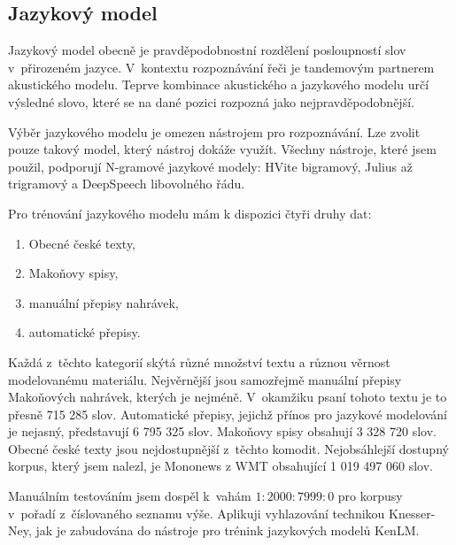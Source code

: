 \subsection{Jazykový model}
\label{sec:jazykovy-model}

Jazykový model obecně je pravděpodobnostní rozdělení posloupností slov
v~přirozeném jazyce\cite{ponte1998language}. V~kontextu rozpoznávání řeči je tandemovým
partnerem akustického modelu\cite{jelinek1990self}. Teprve kombinace akustického
a jazykového modelu určí výsledné slovo, které se na dané pozici rozpozná jako
nejpravděpodobnější.

Výběr jazykového modelu je omezen nástrojem pro rozpoznávání. Lze zvolit pouze
takový model, který nástroj dokáže využít. Všechny nástroje, které jsem použil,
podporují N-gramové jazykové modely: HVite bigramový, Julius až trigramový a
DeepSpeech libovolného řádu.

Pro trénování jazykového modelu mám k dispozici čtyři druhy dat:
\begin{enumerate}
\item{Obecné české texty,}
\item{Makoňovy spisy,}
\item{manuální přepisy nahrávek,}
\item{automatické přepisy.}
\end{enumerate}

Každá z~těchto kategorií skýtá různé množství textu a různou věrnost
modelovanému materiálu. Nejvěrnější jsou samozřejmě manuální přepisy Makoňových
nahrávek, kterých je nejméně. V~okamžiku psaní tohoto textu je to přesně 715 285
slov. Automatické přepisy, jejichž přínos pro jazykové modelování je nejasný,
představují 6 795 325 slov. Makoňovy spisy obsahují 3 328 720 slov. Obecné české
texty jsou nejdostupnější z~těchto komodit. Nejobsáhlejší dostupný korpus, který
jsem nalezl, je Mononews z WMT\cite{wmt19} obsahující 1 019 497 060 slov.

Manuálním testováním jsem dospěl k~vahám $1 : 2000 : 7999 : 0$ pro korpusy
v~pořadí z~číslovaného seznamu výše. Aplikuji vyhlazování technikou
Knesser-Ney\cite{chen1999empirical}, jak je zabudována do nástroje pro trénink
jazykových modelů KenLM\cite{heafield2011kenlm}.

